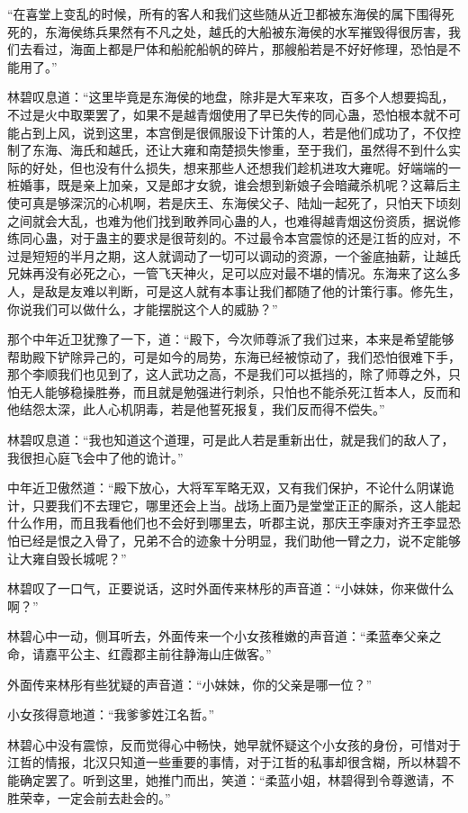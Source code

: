 “在喜堂上变乱的时候，所有的客人和我们这些随从近卫都被东海侯的属下围得死死的，东海侯练兵果然有不凡之处，越氏的大船被东海侯的水军摧毁得很厉害，我们去看过，海面上都是尸体和船舵船帆的碎片，那艘船若是不好好修理，恐怕是不能用了。”

林碧叹息道：“这里毕竟是东海侯的地盘，除非是大军来攻，百多个人想要捣乱，不过是火中取栗罢了，如果不是越青烟使用了早已失传的同心蛊，恐怕根本就不可能占到上风，说到这里，本宫倒是很佩服设下计策的人，若是他们成功了，不仅控制了东海、海氏和越氏，还让大雍和南楚损失惨重，至于我们，虽然得不到什么实际的好处，但也没有什么损失，想来那些人还想我们趁机进攻大雍呢。好端端的一桩婚事，既是亲上加亲，又是郎才女貌，谁会想到新娘子会暗藏杀机呢？这幕后主使可真是够深沉的心机啊，若是庆王、东海侯父子、陆灿一起死了，只怕天下顷刻之间就会大乱，也难为他们找到敢养同心蛊的人，也难得越青烟这份资质，据说修练同心蛊，对于蛊主的要求是很苛刻的。不过最令本宫震惊的还是江哲的应对，不过是短短的半月之期，这人就调动了一切可以调动的资源，一个釜底抽薪，让越氏兄妹再没有必死之心，一管飞天神火，足可以应对最不堪的情况。东海来了这么多人，是敌是友难以判断，可是这人就有本事让我们都随了他的计策行事。修先生，你说我们可以做什么，才能摆脱这个人的威胁？”

那个中年近卫犹豫了一下，道：“殿下，今次师尊派了我们过来，本来是希望能够帮助殿下铲除异己的，可是如今的局势，东海已经被惊动了，我们恐怕很难下手，那个李顺我们也见到了，这人武功之高，不是我们可以抵挡的，除了师尊之外，只怕无人能够稳操胜券，而且就是勉强进行刺杀，只怕也不能杀死江哲本人，反而和他结怨太深，此人心机阴毒，若是他誓死报复，我们反而得不偿失。”

林碧叹息道：“我也知道这个道理，可是此人若是重新出仕，就是我们的敌人了，我很担心庭飞会中了他的诡计。”

中年近卫傲然道：“殿下放心，大将军军略无双，又有我们保护，不论什么阴谋诡计，只要我们不去理它，哪里还会上当。战场上面乃是堂堂正正的厮杀，这人能起什么作用，而且我看他们也不会好到哪里去，听郡主说，那庆王李康对齐王李显恐怕已经是恨之入骨了，兄弟不合的迹象十分明显，我们助他一臂之力，说不定能够让大雍自毁长城呢？”

林碧叹了一口气，正要说话，这时外面传来林彤的声音道：“小妹妹，你来做什么啊？”

林碧心中一动，侧耳听去，外面传来一个小女孩稚嫩的声音道：“柔蓝奉父亲之命，请嘉平公主、红霞郡主前往静海山庄做客。”

外面传来林彤有些犹疑的声音道：“小妹妹，你的父亲是哪一位？”

小女孩得意地道：“我爹爹姓江名哲。”

林碧心中没有震惊，反而觉得心中畅快，她早就怀疑这个小女孩的身份，可惜对于江哲的情报，北汉只知道一些重要的事情，对于江哲的私事却很含糊，所以林碧不能确定罢了。听到这里，她推门而出，笑道：“柔蓝小姐，林碧得到令尊邀请，不胜荣幸，一定会前去赴会的。”

